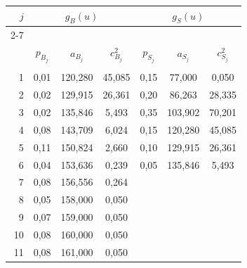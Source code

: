 \begin{table}\small


\begin{center}




\vspace*{2ex}





\begin{tabular}{|r|c|c|c|c|c|c|}


\hline


$j$&\multicolumn{3}{c|}{$g_B(u)$ }&\multicolumn{3}{c|}{$g_S(u)$}\\


\cline{2-7}


&&&&&&\\[-9pt]


&$p_{B_j}$&$a_{B_j}$&$c_{B_j}^2$&$p_{S_j}$&$a_{S_j}$&$c_{S_j}^2$\\


&&&&&&\\[-9pt]


\hline


1&0,01&120,280&45,085\hphantom{9}&0,15&\hphantom{9}77,000&\hphantom{9}0,050\\


2&0,02&129,915&26,361\hphantom{9}&0,20&\hphantom{9}86,263&28,335\\


3&0,02&135,846&5,493&0,35&103,902&70,201\\


4&0,08&143,709&6,024&0,15&120,280&45,085\\


5&0,11&150,824&2,660&0,10&129,915&26,361\\


6&0,04&153,636&0,239&0,05&135,846&\hphantom{9}5,493\\


7&0,08&156,556&0,264&&&\\


8&0,05&158,000&0,050&&&\\


9&0,07&159,000&0,050&&&\\


10&0,08&160,000&0,050&&&\\


11&0,08&161,000&0,050&&&\\



\end{tabular}
\end{center}
\end{table}
